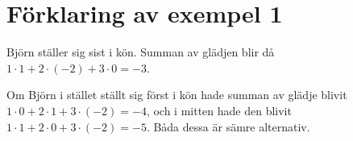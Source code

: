 \section*{Förklaring av exempel 1}

Björn ställer sig sist i kön. Summan av glädjen blir då $1 \cdot 1 + 2\cdot(-2) + 3 \cdot 0 = -3$.

Om Björn i stället ställt sig först i kön hade summan av glädje blivit $1 \cdot 0 + 2 \cdot 1 + 3 \cdot (-2) = -4$, och i mitten hade den blivit $1 \cdot 1 + 2 \cdot 0 + 3 \cdot (-2) = -5$. Båda dessa är sämre alternativ.
